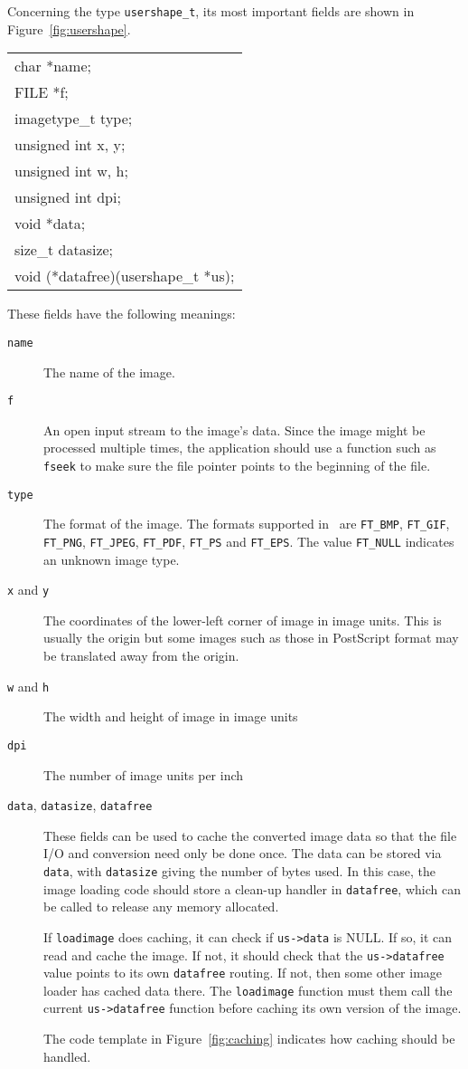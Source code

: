 Concerning the type {\tt usershape\_t}, its most important fields
are shown in Figure~\ref{fig:usershape}.
\begin{figure*}[htbp]
\centering
\begin{tabular}{|l|} \hline
char *name; \\
FILE *f; \\
imagetype\_t type; \\
unsigned int x, y; \\
unsigned int w, h; \\
unsigned int dpi; \\
void *data; \\
size\_t datasize; \\
void (*datafree)(usershape\_t *us); \\
\hline
\end{tabular}
\caption{Fields in {\tt usershape\_t}}
\label{fig:usershape}
\end{figure*}
These fields have the following meanings:
\begin{description}
\item[{\tt name}]
The name of the image.
\item[{\tt f}]
An open input stream to the image's data. Since the image might
be processed multiple times, the application should use a function
such as {\tt fseek} to make sure the file pointer points to the
beginning of the file.
\item[{\tt type}]
The format of the image. The formats supported in \gviz\ are
{\tt FT\_BMP}, {\tt FT\_GIF}, {\tt FT\_PNG}, {\tt FT\_JPEG}, {\tt FT\_PDF}, 
{\tt FT\_PS} and {\tt FT\_EPS}. The value {\tt FT\_NULL} indicates an
unknown image type. 
\item[{\tt x} and {\tt y}]
The coordinates of the lower-left corner of image in image units.
This is usually the origin but some images such as those in PostScript
format may be translated away from the origin.
\item[{\tt w} and {\tt h}]
The width and height of image in image units
\item[{\tt dpi}]
The number of image units per inch
\item[{\tt data}, {\tt datasize}, {\tt datafree}]
These fields can be used to cache the converted image data so
that the file I/O and conversion need only be done once. The
data can be stored via {\tt data}, with {\tt datasize} giving the
number of bytes used. In this case, the image loading code should
store a clean-up handler in {\tt datafree}, which can be called
to release any memory allocated. 

If {\tt loadimage} does caching, it can check if {\tt us->data}
is NULL. If so, it can read and cache the image. If not, it should
check that the {\tt us->datafree} value points to its own {\tt datafree}
routing. If not, then some other image loader has cached data there.
The {\tt loadimage} function must them call the current {\tt us->datafree}
function before caching its own version of the image. 

The code template in Figure~\ref{fig:caching}
indicates how caching should be handled.
\end{description}
